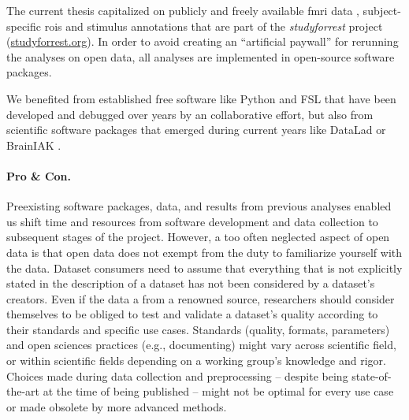 The current thesis capitalized on publicly and freely available
%
\ac{fmri} data \citep{hanke2014audiomovie, hanke2016simultaneous,
sengupta2016extension},
%
subject-specific \acp{roi} \citep{sengupta2016extension} and
%
stimulus annotations \citep{haeusler2016cutanno}
%
that are part of the \textit{studyforrest} project
(\href{www.studyforrest.org}{\url{studyforrest.org}}).
%
In order to avoid creating an ``artificial paywall'' for rerunning the analyses
on open data, all analyses are implemented in open-source software
packages.

We benefited from established free software like
%
Python and
%
FSL \citep[\href{https://www.fmrib.ox.ac.uk/fsl}{FMRIB's Software
Library;}][]{smith2004fsl} that have been developed and debugged over years by
an collaborative effort,
%
but also from scientific software packages that emerged during current years
like
%
DataLad
\citep[\href{www.datalad.org}{\url{datalad.org}};][]{halchenko2021datalad} or
%
BrainIAK
\citep[\href{https://brainiak.org}{\url{brainiak.org}};][]{kumar2020brainiak,
kumar2020brainiaktutorial}.


\paragraph{Pro \& Con.}

Preexisting software packages, data, and results from previous analyses enabled
us shift time and resources from software development and data collection to
subsequent stages of the project.
%
However, a too often neglected aspect of open data is that open data does not
exempt from the duty to familiarize yourself with the data.
Dataset consumers need to assume that everything that is not explicitly
stated in the description of a dataset has not been considered by a dataset's
creators.
Even if the data a from a renowned source, researchers should consider
themselves to be obliged to test and validate a dataset's quality according to
their standards and specific use cases.
%
Standards (quality, formats, parameters) and open sciences practices (e.g.,
documenting) might vary across scientific field, or within scientific fields
depending on a working group's knowledge and rigor.
%
Choices made during data collection and preprocessing -- despite being
state-of-the-art at the time of being published -- might not be optimal for
every use case or made obsolete by more advanced methods.


